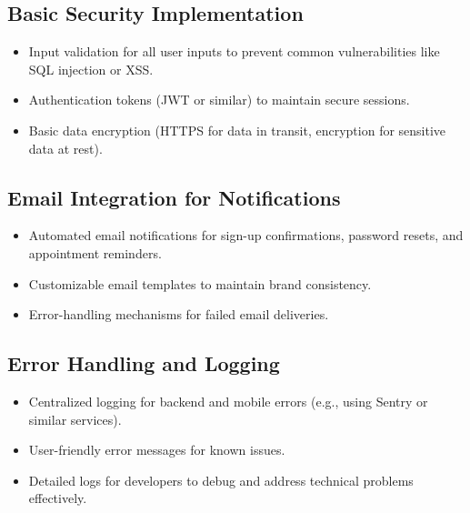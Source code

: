 \subsection{Basic Security Implementation}  
\begin{itemize}  
    \item Input validation for all user inputs to prevent common vulnerabilities like SQL injection or XSS.  
    \item Authentication tokens (JWT or similar) to maintain secure sessions.  
    \item Basic data encryption (HTTPS for data in transit, encryption for sensitive data at rest).  
\end{itemize}  

\subsection{Email Integration for Notifications}  
\begin{itemize}  
    \item Automated email notifications for sign-up confirmations, password resets, and appointment reminders.  
    \item Customizable email templates to maintain brand consistency.  
    \item Error-handling mechanisms for failed email deliveries.  
\end{itemize}  

\subsection{Error Handling and Logging}  
\begin{itemize}  
    \item Centralized logging for backend and mobile errors (e.g., using Sentry or similar services).  
    \item User-friendly error messages for known issues.  
    \item Detailed logs for developers to debug and address technical problems effectively.  
\end{itemize}  
